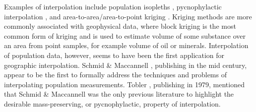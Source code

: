 \documentclass[draft]{article}
\begin{document}
Examples of interpolation %
include population isopleths \cite{schmid55}, pycnophylactic interpolation \cite{tobler79}, and area-to-area/area-to-point kriging \cite{krivoruchko11, kyriakidis04}.  Kriging methods are more commonly associated with geophysical data, where block kriging \cite{cressie90, matheron63} is the most common form of kriging and is used to estimate volume of some substance over an area from point samples, for example volume of oil or minerals.  Interpolation of population data, however, seems to have been the first application for geographic interpolation.  
Schmid \& Maccannell \cite{schmid55}, publishing in the mid  century, appear to be the first to formally address the techniques and problems of interpolating population measurements.  
Tobler \cite{tobler79}, publishing in 1979, mentioned that Schmid \& Maccannell was the only previous literature to highlight the desirable mass-preserving, or pycnophylactic, property of interpolation.
\end{document}
